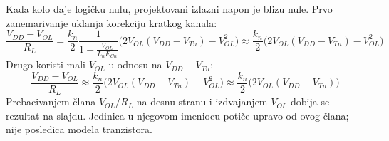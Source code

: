 Kada kolo daje logičku nulu, projektovani izlazni napon je blizu nule. Prvo zanemarivanje uklanja korekciju kratkog kanala:
\[\frac{V_{DD}-V_{OL}}{R_L}=\frac{k_n}{2}\frac1{1+\frac{V_{OL}}{L_nE_{Cn}}}\bigl(2V_{OL}(V_{DD}-V_{Tn})-V_{OL}^2\bigr)\approx\frac{k_n}{2}\bigl(2V_{OL}(V_{DD}-V_{Tn})-V_{OL}^2\bigr)\]
Drugo koristi mali $V_{OL}$ u odnosu na $V_{DD}-V_{Tn}$:
\[\frac{V_{DD}-V_{OL}}{R_L}\approx\frac{k_n}{2}\bigl(2V_{OL}(V_{DD}-V_{Tn})-V_{OL}^2\bigr)\approx\frac{k_n}{2}\bigl(2V_{OL}(V_{DD}-V_{Tn})\bigr)\]
Prebacivanjem člana $V_{OL}/R_L$ na desnu stranu i izdvajanjem $V_{OL}$ dobija se rezultat na slajdu. Jedinica u njegovom imeniocu potiče upravo od ovog člana; nije posledica modela tranzistora.
